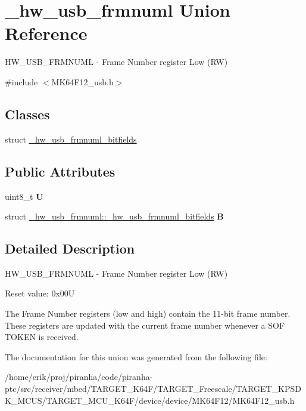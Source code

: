 \hypertarget{union__hw__usb__frmnuml}{}\section{\+\_\+hw\+\_\+usb\+\_\+frmnuml Union Reference}
\label{union__hw__usb__frmnuml}


H\+W\+\_\+\+U\+S\+B\+\_\+\+F\+R\+M\+N\+U\+ML -\/ Frame Number register Low (RW)  




{\ttfamily \#include $<$M\+K64\+F12\+\_\+usb.\+h$>$}

\subsection*{Classes}
\begin{DoxyCompactItemize}
\item 
struct \hyperlink{struct__hw__usb__frmnuml_1_1__hw__usb__frmnuml__bitfields}{\+\_\+hw\+\_\+usb\+\_\+frmnuml\+\_\+bitfields}
\end{DoxyCompactItemize}
\subsection*{Public Attributes}
\begin{DoxyCompactItemize}
\item 
uint8\+\_\+t {\bfseries U}\hypertarget{union__hw__usb__frmnuml_aee951b644f87e7ce14558659b59f0e65}{}\label{union__hw__usb__frmnuml_aee951b644f87e7ce14558659b59f0e65}

\item 
struct \hyperlink{struct__hw__usb__frmnuml_1_1__hw__usb__frmnuml__bitfields}{\+\_\+hw\+\_\+usb\+\_\+frmnuml\+::\+\_\+hw\+\_\+usb\+\_\+frmnuml\+\_\+bitfields} {\bfseries B}\hypertarget{union__hw__usb__frmnuml_add9d74cac1c058a03af980b59aa6fa6a}{}\label{union__hw__usb__frmnuml_add9d74cac1c058a03af980b59aa6fa6a}

\end{DoxyCompactItemize}


\subsection{Detailed Description}
H\+W\+\_\+\+U\+S\+B\+\_\+\+F\+R\+M\+N\+U\+ML -\/ Frame Number register Low (RW) 

Reset value\+: 0x00U

The Frame Number registers (low and high) contain the 11-\/bit frame number. These registers are updated with the current frame number whenever a S\+OF T\+O\+K\+EN is received. 

The documentation for this union was generated from the following file\+:\begin{DoxyCompactItemize}
\item 
/home/erik/proj/piranha/code/piranha-\/ptc/src/receiver/mbed/\+T\+A\+R\+G\+E\+T\+\_\+\+K64\+F/\+T\+A\+R\+G\+E\+T\+\_\+\+Freescale/\+T\+A\+R\+G\+E\+T\+\_\+\+K\+P\+S\+D\+K\+\_\+\+M\+C\+U\+S/\+T\+A\+R\+G\+E\+T\+\_\+\+M\+C\+U\+\_\+\+K64\+F/device/device/\+M\+K64\+F12/M\+K64\+F12\+\_\+usb.\+h\end{DoxyCompactItemize}
